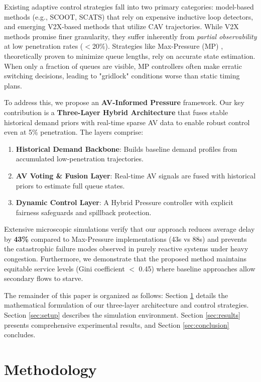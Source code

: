 \documentclass[conference]{IEEEtran}
\begin{document}
Existing adaptive control strategies fall into two primary categories: model-based methods (e.g., SCOOT, SCATS) that rely on expensive inductive loop detectors, and emerging V2X-based methods that utilize CAV trajectories. While V2X methods promise finer granularity, they suffer inherently from \textit{partial observability} at low penetration rates ($<$20\%). Strategies like Max-Pressure (MP) \cite{varaiya2013max}, theoretically proven to minimize queue lengths, rely on accurate state estimation. When only a fraction of queues are visible, MP controllers often make erratic switching decisions, leading to "gridlock" conditions worse than static timing plans.

To address this, we propose an \textbf{AV-Informed Pressure} framework. Our key contribution is a \textbf{Three-Layer Hybrid Architecture} that fuses stable historical demand priors with real-time sparse AV data to enable robust control even at 5\% penetration. The layers comprise:
\begin{enumerate}
    \item \textbf{Historical Demand Backbone}: Builds baseline demand profiles from accumulated low-penetration trajectories.
    \item \textbf{AV Voting \& Fusion Layer}: Real-time AV signals are fused with historical priors to estimate full queue states.
    \item \textbf{Dynamic Control Layer}: A Hybrid Pressure controller with explicit fairness safeguards and spillback protection.
\end{enumerate}

Extensive microscopic simulations verify that our approach reduces average delay by \textbf{43\%} compared to Max-Pressure implementations (43s vs 88s) and prevents the catastrophic failure modes observed in purely reactive systems under heavy congestion. Furthermore, we demonstrate that the proposed method maintains equitable service levels (Gini coefficient $<$ 0.45) where baseline approaches allow secondary flows to starve.

The remainder of this paper is organized as follows: Section \ref{sec:methodology} details the mathematical formulation of our three-layer architecture and control strategies. Section \ref{sec:setup} describes the simulation environment. Section \ref{sec:results} presents comprehensive experimental results, and Section \ref{sec:conclusion} concludes.

\section{Methodology}
\label{sec:methodology}
\end{document}
